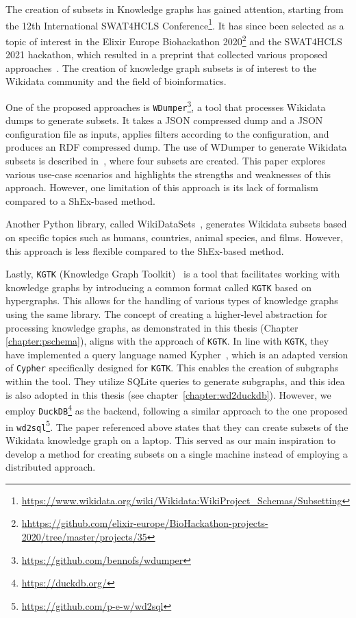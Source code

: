 The creation of subsets in Knowledge graphs has gained attention, starting from the 12th International SWAT4HCLS Conference\footnote{\url{https://www.wikidata.org/wiki/Wikidata:WikiProject_Schemas/Subsetting}}. It has since been selected as a topic of interest in the Elixir Europe Biohackathon 2020\footnote{\url{hhttps://github.com/elixir-europe/BioHackathon-projects-2020/tree/master/projects/35}} and the SWAT4HCLS 2021 hackathon, which resulted in a preprint that collected various proposed approaches~\cite{labra-gayo2021}. The creation of knowledge graph subsets is of interest to the Wikidata community and the field of bioinformatics.

One of the proposed approaches is \texttt{WDumper}\footnote{\url{https://github.com/bennofs/wdumper}}, a tool that processes Wikidata dumps to generate subsets. It takes a JSON compressed dump and a JSON configuration file as inputs, applies filters according to the configuration, and produces an RDF compressed dump. The use of WDumper to generate Wikidata subsets is described in~\cite{wdumper}, where four subsets are created. This paper explores various use-case scenarios and highlights the strengths and weaknesses of this approach. However, one limitation of this approach is its lack of formalism compared to a ShEx-based method.

Another Python library, called WikiDataSets~\cite{boschin2019wikidatasets}, generates Wikidata subsets based on specific topics such as humans, countries, animal species, and films. However, this approach is less flexible compared to the ShEx-based method.

Lastly, \texttt{KGTK} (Knowledge Graph Toolkit)~\cite{ilievski2021kgtk} is a tool that facilitates working with knowledge graphs by introducing a common format called \texttt{KGTK} based on hypergraphs. This allows for the handling of various types of knowledge graphs using the same library. The concept of creating a higher-level abstraction for processing knowledge graphs, as demonstrated in this thesis (Chapter \ref{chapter:pschema}), aligns with the approach of \texttt{KGTK}. In line with \texttt{KGTK}, they have implemented a query language named Kypher~\cite{chalupsky2021creating}, which is an adapted version of \texttt{Cypher} specifically designed for \texttt{KGTK}. This enables the creation of subgraphs within the tool. They utilize SQLite queries to generate subgraphs, and this idea is also adopted in this thesis (see chapter~\ref{chapter:wd2duckdb}). However, we employ \texttt{DuckDB}\footnote{\url{https://duckdb.org/}} as the backend, following a similar approach to the one proposed in \texttt{wd2sql}\footnote{\url{https://github.com/p-e-w/wd2sql}}. The paper referenced above states that they can create subsets of the Wikidata knowledge graph on a laptop. This served as our main inspiration to develop a method for creating subsets on a single machine instead of employing a distributed approach.

